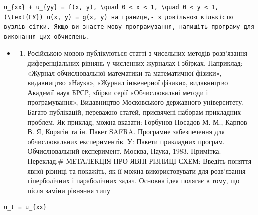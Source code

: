 \documentclass[
  ukrainian,
]{article}
\providecommand{\tightlist}{%
  \setlength{\itemsep}{0pt}\setlength{\parskip}{0pt}}
\begin{document}
\begin{verbatim}
u_{xx} + u_{yy} = f(x, y), \quad 0 < x < 1, \quad 0 < y < 1, (\text{ГУ}) u(x, y) = g(x, y) на границе,- з довільною кількістю вузлів сітки. Якщо ви знаєте мову програмування, напишіть програму для виконання цих обчислень.
\end{verbatim}

\begin{itemize}
\tightlist
\item
  \begin{enumerate}
  \def\labelenumi{\arabic{enumi})}
  \tightlist
  \item
    Російською мовою публікуються статті з чисельних методів розв'язання
    диференціальних рівнянь у численних журналах і збірках. Наприклад:
    «Журнал обчислювальної математики та математичної фізики»,
    видавництво «Наука», «Журнал інженерної фізики», видавництво
    Академії наук БРСР, збірки серії «Обчислювальні методи і
    програмування», Видавництво Московського державного університету.
    Багато публікацій, переважно статей, присвячені наборам прикладних
    проблем. Як приклад, можна вказати: Горбунов-Посадов М. М., Карпов
    В. Я, Корягін та ін. Пакет SAFRA. Програмне забезпечення для
    обчислювальних експериментів. У: Пакети прикладних програм.
    Обчислювальний експеримент. Москва, Наука, 1983. Примітка.
    Переклад.\# МЕТАЛЕКЦІЯ ПРО ЯВНІ РІЗНИЦІ СХЕМ: Введіть поняття явної
    різниці та покажіть, як її можна використовувати для розв'язання
    гіперболічних і параболічних задач. Основна ідея полягає в тому, що
    після заміни рівняння типу
  \end{enumerate}
\end{itemize}

\begin{verbatim}
u_t = u_{xx}
\end{verbatim}
\end{document}
